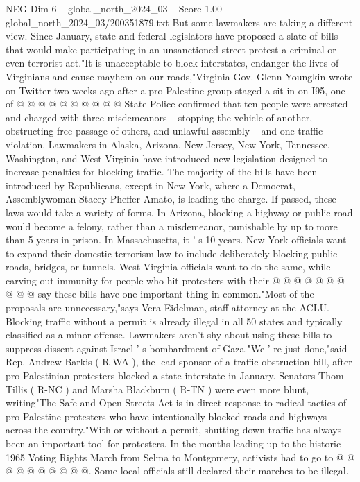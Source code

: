 \begin{textsample}{NEG Dim 6 – global\_north\_2024\_03 – Score 1.00 – global\_north\_2024\_03/200351879.txt}
But some lawmakers are taking a different view.
Since January, state and federal legislators have proposed a slate of bills that would make participating in an unsanctioned street protest a criminal or even terrorist act."It is unacceptable to block interstates, endanger the lives of Virginians and cause mayhem on our roads,"Virginia Gov.
Glenn Youngkin wrote on Twitter two weeks ago after a pro-Palestine group staged a sit-in on I95, one of @ @ @ @ @ @ @ @ @ @ State Police confirmed that ten people were arrested and charged with three misdemeanors -- stopping the vehicle of another, obstructing free passage of others, and unlawful assembly -- and one traffic violation.
Lawmakers in Alaska, Arizona, New Jersey, New York, Tennessee, Washington, and West Virginia have introduced new legislation designed to increase penalties for blocking traffic.
The majority of the bills have been introduced by Republicans, except in New York, where a Democrat, Assemblywoman Stacey Pheffer Amato, is leading the charge.
If passed, these laws would take a variety of forms.
In Arizona, blocking a highway or public road would become a felony, rather than a misdemeanor, punishable by up to more than 5 years in prison.
In Massachusetts, it ' s 10 years.
New York officials want to expand their domestic terrorism law to include deliberately blocking public roads, bridges, or tunnels.
West Virginia officials want to do the same, while carving out immunity for people who hit protesters with their @ @ @ @ @ @ @ @ @ @ say these bills have one important thing in common."Most of the proposals are unnecessary,"says Vera Eidelman, staff attorney at the ACLU.
Blocking traffic without a permit is already illegal in all 50 states and typically classified as a minor offense.
Lawmakers aren't shy about using these bills to suppress dissent against Israel ' s bombardment of Gaza."We ' re just done,"said Rep.
Andrew Barkis ( R-WA ), the lead sponsor of a traffic obstruction bill, after pro-Palestinian protesters blocked a state interstate in January.
Senators Thom Tillis ( R-NC ) and Marsha Blackburn ( R-TN ) were even more blunt, writing"The Safe and Open Streets Act is in direct response to radical tactics of pro-Palestine protesters who have intentionally blocked roads and highways across the country."With or without a permit, shutting down traffic has always been an important tool for protesters.
In the months leading up to the historic 1965 Voting Rights March from Selma to Montgomery, activists had to go to @ @ @ @ @ @ @ @ @ @.
Some local officials still declared their marches to be illegal.

\end{textsample}
